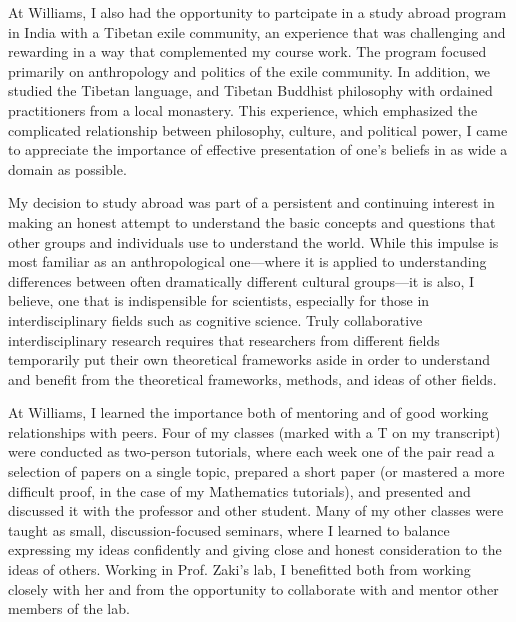 \documentclass[12pt]{article}
\begin{document}
At Williams, I also had the opportunity to partcipate in a study abroad program in India with a Tibetan exile community, an experience that was challenging and rewarding in a way that complemented my course work.  The program focused primarily on anthropology and politics of the exile community.  In addition, we studied the Tibetan language, and Tibetan Buddhist philosophy with ordained practitioners from a local monastery.  This experience, which emphasized the complicated relationship between philosophy, culture, and political power, I came to appreciate the importance of effective presentation of one's beliefs in as wide a domain as possible.

My decision to study abroad was part of a persistent and continuing interest in making an honest attempt to understand the basic concepts and questions that other groups and individuals use to understand the world.  While this impulse is most familiar as an anthropological one---where it is applied to understanding differences between often dramatically different cultural groups---it is also, I believe, one that is indispensible for scientists, especially for those in interdisciplinary fields such as cognitive science.  Truly collaborative interdisciplinary research requires that researchers from different fields temporarily put their own theoretical frameworks aside in order to understand and benefit from the theoretical frameworks, methods, and ideas of other fields.  


At Williams, I learned the importance both of mentoring and of good working relationships with peers.  
Four of my classes (marked with a T on my transcript) were conducted as two-person tutorials, where each week one of the pair read a selection of papers on a single topic, prepared a short paper (or mastered a more difficult proof, in the case of my Mathematics tutorials), and presented and discussed it with the professor and other student.  
Many of my other classes were taught as small, discussion-focused seminars, where I learned to balance expressing my ideas confidently and giving close and honest consideration to the ideas of others.  
 Working in Prof. Zaki's lab, I benefitted both from working closely with her and from the opportunity to collaborate with and mentor other members of the lab.  
\end{document}
